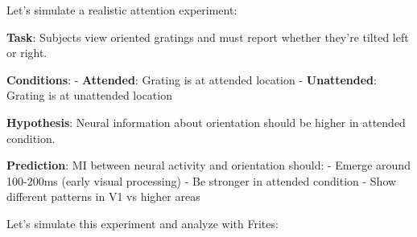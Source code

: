 \documentclass[
  11pt,
  letterpaper,
  oneside,
  openany]{book}
\begin{document}
Let's simulate a realistic attention experiment:

\textbf{Task}: Subjects view oriented gratings and must report whether
they're tilted left or right.

\textbf{Conditions}: - \textbf{Attended}: Grating is at attended
location - \textbf{Unattended}: Grating is at unattended location

\textbf{Hypothesis}: Neural information about orientation should be
higher in attended condition.

\textbf{Prediction}: MI between neural activity and orientation should:
- Emerge around 100-200ms (early visual processing) - Be stronger in
attended condition - Show different patterns in V1 vs higher areas

Let's simulate this experiment and analyze with Frites:
\end{document}
